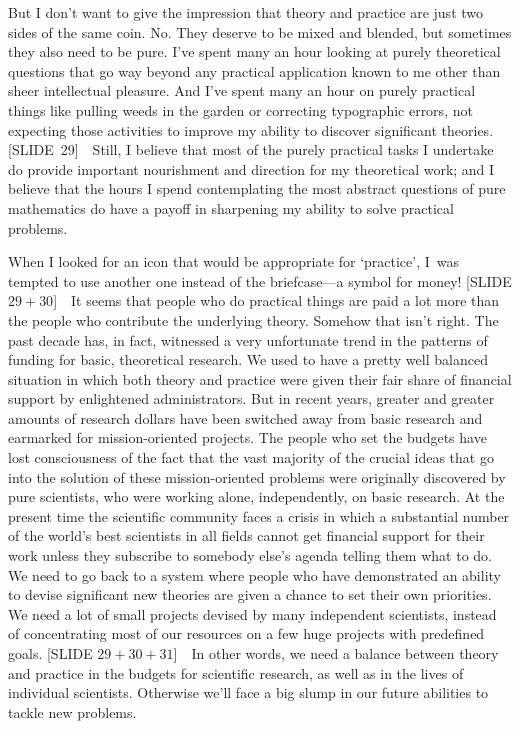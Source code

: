 But I don't want to give the impression that theory and practice are
just two sides of the same coin. No. They deserve to be mixed and
blended, but sometimes they also need to be pure. I've spent many an
hour looking at purely theoretical questions that go way beyond any
practical application known to me other than sheer intellectual
pleasure. And I've spent many an hour on purely practical things like
pulling weeds in the garden or correcting typographic errors, not
expecting those activities to improve my ability to discover
significant theories. [SLIDE~29]\ \ Still, I believe that most of the
purely practical tasks I undertake do provide important nourishment
and direction for my theoretical work; and I believe that the hours I
spend contemplating the most abstract questions of pure mathematics do
have a payoff in sharpening my ability to solve practical problems.

When I looked for an icon that would be appropriate for `practice',
I~was tempted to use another one instead of the briefcase---a symbol
for money! [SLIDE $29+30$]\ \ It seems that people who do practical
things are paid a lot more than the people who contribute the
underlying theory. Somehow that isn't right. The past decade has, in
fact, witnessed a very unfortunate trend in the patterns of funding
for basic, theoretical research. We used to have a pretty well
balanced situation in which both theory and practice were given their
fair share of financial support by enlightened administrators. But in
recent years, greater and greater amounts of research dollars have been
switched away from basic research and earmarked for mission-oriented
projects. The people who set the budgets have lost consciousness of
the fact that the vast majority of the crucial ideas that go into the
solution of these mission-oriented problems were originally discovered
by pure scientists, who were working alone, independently, on basic
research. At the present time the scientific community faces a crisis
in which a substantial number of the world's best scientists in all
fields cannot get financial support for their work unless they
subscribe to somebody else's agenda telling them what to do. We need
to go back to a system where people who have demonstrated an ability
to devise significant new theories are given a chance to set their own
priorities. We need a lot of small projects devised by many
independent scientists, instead of concentrating most of our resources
on a few huge projects with predefined goals. [SLIDE $29+30+31$]\ \ 
In other words, we need a balance between theory and practice in the
budgets for scientific research, as well as in the lives of individual
scientists. Otherwise we'll face a big slump in our future abilities
to tackle new problems.

